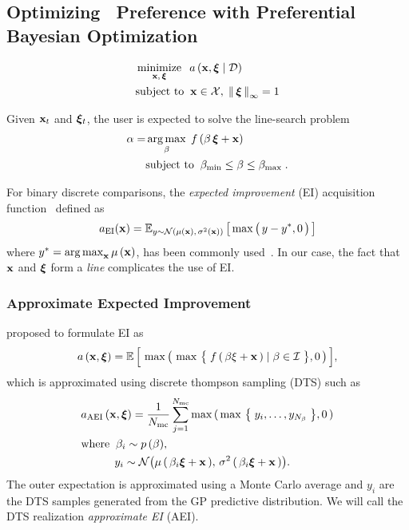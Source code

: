 \subsection{Optimizing \User~Preference with Preferential Bayesian Optimization}\label{section:bo}

\begin{align}
 &\operatorname*{minimize}_{\mathbf{x},\, \bm{\xi}}\;\; a\,(\mathbf{x}, \bm{\xi} \mid \mathcal{D}) \\
 &\text{subject to}\;\; \mathbf{x} \in \mathcal{X},\; \left\lVert\, \bm{\xi} \,\right\rVert_{\infty} = 1
\end{align}

Given \(\mathbf{x}_t\) and \(\bm{\xi}_t\), the user is expected to solve the line-search problem
\begin{align}
 \alpha = &\operatorname*{arg\,max}_{ \beta }\; f\,(\beta\,\bm{\xi} + \mathbf{x}) \\
 &\text{subject to}\;\; \beta_{\text{min}} \leq \beta \leq \beta_{\text{max}}\;.
\end{align}

For binary discrete comparisons, the \textit{expected improvement} (EI) acquisition function~\cite{jones_efficient_1998} defined as
\begin{align}
  a_{\mathrm{EI}}(\mathbf{x}) = \mathbb{E}_{ y \sim \mathcal{N}(\mu(\mathbf{x}),\, \sigma^{2}(\mathbf{x})) }\left[\, \max\big(\, y - y^*, 0 \,\big) \,\right]
\end{align}
where \(y^* = \operatorname*{arg\,max}_{\mathbf{x}} \mu\,(\mathbf{x}) \), has been commonly used~\cite{NIPS2007_b6a1085a}.
In our case, the fact that \(\mathbf{x}\) and \(\bm{\xi}\) form a \textit{line} complicates the use of EI.

\subsubsection{Approximate Expected Improvement}
\cite{10.1145/3072959.3073598} proposed to formulate EI as
\begin{align}
  a\,(\mathbf{x}, \bm{\xi})
  = \mathbb{E}\,\Big[\, \max\big(\, \max\,\big\{\; f\,(\,\beta \xi + \mathbf{x}\,) \mid \beta \in \mathcal{I} \;\big\}, 0 \,\big)\,\Big],
\end{align}
which is approximated using discrete thompson sampling (DTS) such as
\begin{align}
  &a_{\mathrm{AEI}}\,(\mathbf{x}, \bm{\xi}) 
  = \frac{1}{N_{\mathrm{mc}}} \sum_{j=1}^{N_{\mathrm{mc}}} \max\,(\, \max\,\big\{\; y_i, \ldots, y_{N_\beta} \;\big\}, 0 \,) \label{eq:aei} \\
  &\text{where} \;\;  \beta_i \sim p\,(\beta), \nonumber\\
  &\quad\qquad y_i \sim \mathcal{N}\big( \mu\,(\,\beta_i \bm{\xi} + \mathbf{x} \,),\, \sigma^2\,(\, \beta_i \bm{\xi} + \mathbf{x} \,) \big).\nonumber
\end{align}
The outer expectation is approximated using a Monte Carlo average and \(y_i\) are the DTS samples generated from the GP predictive distribution.
We will call the DTS realization \textit{approximate EI} (AEI).

